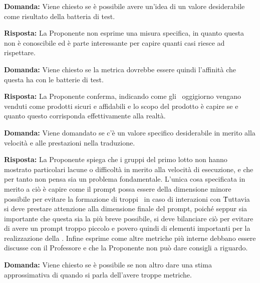 \par \textbf{Domanda:} Viene chiesto se è possibile avere un'idea di un valore desiderabile come risultato della batteria di test.

\par \textbf{Risposta:} La Proponente non esprime una misura specifica, in quanto questa non è conoscibile ed è parte interessante per capire quanti casi riesce ad rispettare.

\par \textbf{Domanda:} Viene chiesto se la metrica dovrebbe essere quindi l'affinità che questa ha con le batterie di test.

\par \textbf{Risposta:} La Proponente conferma, indicando come gli \ oggigiorno vengano venduti come prodotti sicuri e affidabili e lo scopo del prodotto è capire se e quanto questo corrisponda effettivamente alla realtà.

\par \textbf{Domanda:} Viene domandato se c'è un valore specifico desiderabile in merito alla velocità e alle prestazioni nella traduzione.

\par \textbf{Risposta:} La Proponente spiega che i gruppi del primo lotto non hanno mostrato particolari lacune o difficoltà in merito alla velocità di esecuzione, e che per tanto non pensa sia un problema fondamentale.
L'unica cosa specificata in merito a ciò è capire come il prompt possa essere della dimensione minore possibile per evitare la formazione di troppi \ in caso di interazioni con \.
Tuttavia si deve prestare attenzione alla dimensione finale del prompt, poiché seppur sia importante che questa sia la più breve possibile, si deve bilanciare ciò per evitare di avere un prompt troppo piccolo e povero quindi di elementi importanti per la realizzazione della .
Infine esprime come altre metriche più interne debbano essere discusse con il Professore e che la Proponente non può dare consigli a riguardo.

\par \textbf{Domanda:} Viene chiesto se è possibile se non altro dare una stima approssimativa di quando si parla dell'avere troppe metriche.

